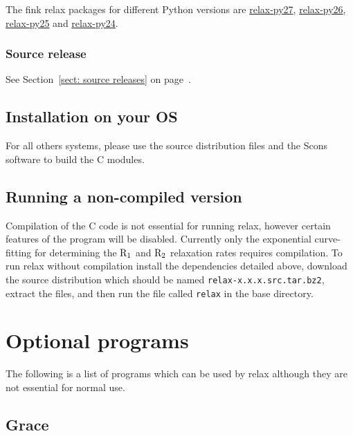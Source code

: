 The fink relax packages for different Python versions are \href{http://pdb.finkproject.org/pdb/package.php/relax-py27}{relax-py27}, \href{http://pdb.finkproject.org/pdb/package.php/relax-py26}{relax-py26}, \href{http://pdb.finkproject.org/pdb/package.php/relax-py25}{relax-py25} and \href{http://pdb.finkproject.org/pdb/package.php/relax-py24}{relax-py24}.

\subsubsection{Source release}

See Section~\ref{sect: source releases} on page~\pageref{sect: source releases}.


\subsection{Installation on your OS}

For all others systems, please use the source distribution files and the Scons software to build the C modules.



\subsection{Running a non-compiled version}

Compilation of the C code is not essential for running relax, however certain features of the program will be disabled.  Currently only the exponential curve-fitting for determining the $\mathrm{R}_1$ and $\mathrm{R}_2$ relaxation rates requires compilation.  To run relax without compilation install the dependencies detailed above, download the source distribution which should be named \texttt{relax-x.x.x.src.tar.bz2}, extract the files, and then run the file called \texttt{relax} in the base directory.




\section{Optional programs}

The following is a list of programs which can be used by relax although they are not essential for normal use.


\subsection{Grace}

